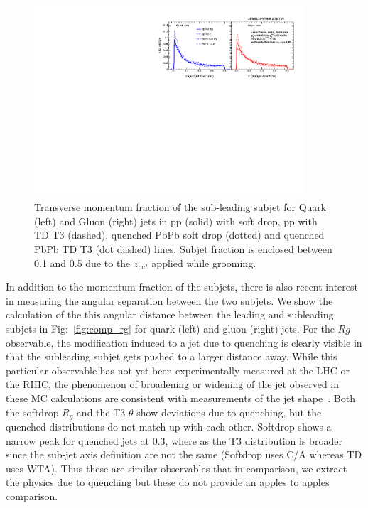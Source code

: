 \documentclass[notoc]{JHEP3}
\begin{document}
\begin{figure}[h]
	   \centering
	   \includegraphics[width=0.9\textwidth]{plots/Comp_z.pdf}
	   \caption{Transverse momentum fraction of the sub-leading subjet for Quark (left) and Gluon (right) jets in pp (solid) with soft drop, pp with TD T3 (dashed), quenched PbPb soft drop (dotted) and quenched PbPb TD T3 (dot dashed) lines. Subjet fraction is enclosed between 0.1 and 0.5 due to the $z_{cut}$ applied while grooming.} 
\label{fig:comp_z}
\end{figure}

In addition to the momentum fraction of the subjets, there is also recent interest in measuring the angular separation between the two subjets. We show the calculation of the this angular distance between the leading and subleading subjets in Fig:~\ref{fig:comp_rg} for quark (left) and gluon (right) jets. For the $R{g}$ observable, the modification induced to a jet due to quenching is clearly visible in that the subleading subjet gets pushed to a larger distance away. While this particular observable has not yet been experimentally measured at the LHC or the RHIC, the phenomenon of broadening or widening of the jet observed in these MC calculations are consistent with measurements of the jet shape~\cite{}. Both the softdrop $R_{g}$ and the T3 $\theta$ show deviations due to quenching, but the quenched distributions do not match up with each other. Softdrop shows a narrow peak for quenched jets at 0.3, where as the T3 distribution is broader since the sub-jet axis definition are not the same (Softdrop uses C/A whereas TD uses WTA). Thus these are similar observables that in comparison, we extract the physics due to quenching but these do not provide an apples to apples comparison.   
\end{document}
